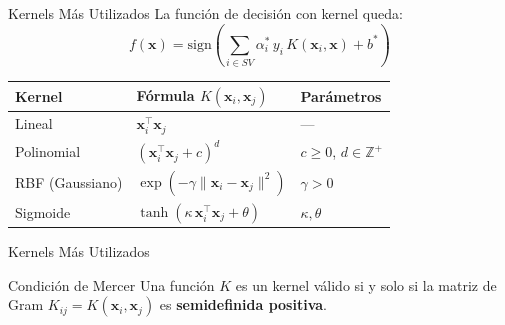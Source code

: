 \documentclass[aspectratio=169,xcolor=dvipsnames]{beamer}
\begin{document}
\begin{frame}{Kernels Más Utilizados}
    La función de decisión con kernel queda:
    \begin{equation}
        f(\mathbf{x}) = \text{sign}\left( \sum_{i \in SV} \alpha_i^* \, y_i \, K(\mathbf{x}_i, \mathbf{x}) + b^* \right)
    \end{equation}

    \vspace{0.4em}
    \begin{center}
    \begin{tabular}{lll}
        \toprule
        \textbf{Kernel} & \textbf{Fórmula} $K(\mathbf{x}_i, \mathbf{x}_j)$ & \textbf{Parámetros} \\
        \midrule
        Lineal        & $\mathbf{x}_i^\top \mathbf{x}_j$ & — \\[4pt]
        Polinomial    & $(\mathbf{x}_i^\top \mathbf{x}_j + c)^d$ & $c \geq 0$, $d \in \mathbb{Z}^+$ \\[4pt]
        RBF (Gaussiano) & $\exp\!\left(-\gamma\|\mathbf{x}_i - \mathbf{x}_j\|^2\right)$ & $\gamma > 0$ \\[4pt]
        Sigmoide      & $\tanh(\kappa\,\mathbf{x}_i^\top \mathbf{x}_j + \theta)$ & $\kappa,\theta$ \\
        \bottomrule
    \end{tabular}
    \end{center}
\end{frame}
\begin{frame}{Kernels Más Utilizados}

    \begin{exampleblock}{Condición de Mercer}
        Una función $K$ es un kernel válido si y solo si la matriz de Gram $K_{ij} = K(\mathbf{x}_i,\mathbf{x}_j)$ es \textbf{semidefinida positiva}.
    \end{exampleblock}
\end{frame}
\end{document}
